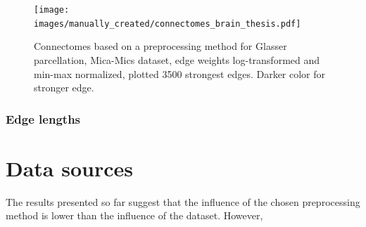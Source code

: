 \begin{figure}
  \begin{center}
    \texttt{[image: images/manually\_created/connectomes\_brain\_thesis.pdf]}
  \end{center}
  \caption[Connectomes based on preprocessing method]{Connectomes based on a preprocessing method for Glasser parcellation, Mica-Mics dataset, edge weights log-transformed and min-max normalized, plotted 3500 strongest edges. Darker color for stronger edge.}
  \label{fig:edge_weights}
\end{figure}

\subsubsection{Edge lengths}


\section{Data sources}


The results presented so far suggest that the influence of the chosen preprocessing method is lower than the influence of the dataset. However, 